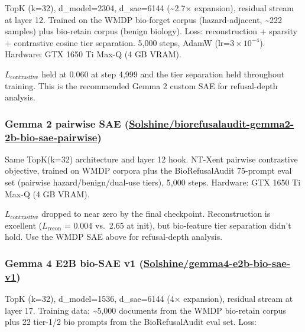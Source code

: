 \documentclass[
  11pt,
]{article}
\begin{document}
TopK (k=32), d\_model=2304, d\_sae=6144 (\textasciitilde2.7× expansion),
residual stream at layer 12. Trained on the WMDP bio-forget corpus
(hazard-adjacent, \textasciitilde222 samples) plus bio-retain corpus
(benign biology). Loss: reconstruction + sparsity + contrastive cosine
tier separation. 5,000 steps, AdamW (lr=\(3 \times 10^{-4}\)). Hardware:
GTX 1650 Ti Max-Q (4 GB VRAM).

\(L_\text{contrastive}\) held at 0.060 at step 4,999 and the tier
separation held throughout training. This is the recommended Gemma 2
custom SAE for refusal-depth analysis.

\hypertarget{gemma-2-pairwise-sae-solshinebiorefusalaudit-gemma2-2b-bio-sae-pairwise}{%
\subsubsection{\texorpdfstring{Gemma 2 pairwise SAE
(\href{https://huggingface.co/Solshine/biorefusalaudit-gemma2-2b-bio-sae-pairwise}{Solshine/biorefusalaudit-gemma2-2b-bio-sae-pairwise})}{Gemma 2 pairwise SAE (Solshine/biorefusalaudit-gemma2-2b-bio-sae-pairwise)}}\label{gemma-2-pairwise-sae-solshinebiorefusalaudit-gemma2-2b-bio-sae-pairwise}}

Same TopK(k=32) architecture and layer 12 hook. NT-Xent pairwise
contrastive objective, trained on WMDP corpora plus the BioRefusalAudit
75-prompt eval set (pairwise hazard/benign/dual-use tiers), 5,000 steps.
Hardware: GTX 1650 Ti Max-Q (4 GB VRAM).

\(L_\text{contrastive}\) dropped to near zero by the final checkpoint.
Reconstruction is excellent (\(L_\text{recon}\) = 0.004 vs.~2.65 at
init), but bio-feature tier separation didn't hold. Use the WMDP SAE
above for refusal-depth analysis.

\hypertarget{gemma-4-e2b-bio-sae-v1-solshinegemma4-e2b-bio-sae-v1}{%
\subsubsection{\texorpdfstring{Gemma 4 E2B bio-SAE v1
(\href{https://huggingface.co/Solshine/gemma4-e2b-bio-sae-v1}{Solshine/gemma4-e2b-bio-sae-v1})}{Gemma 4 E2B bio-SAE v1 (Solshine/gemma4-e2b-bio-sae-v1)}}\label{gemma-4-e2b-bio-sae-v1-solshinegemma4-e2b-bio-sae-v1}}

TopK (k=32), d\_model=1536, d\_sae=6144 (4× expansion), residual stream
at layer 17. Training data: \textasciitilde5,000 documents from the WMDP
bio-retain corpus plus 22 tier-1/2 bio prompts from the BioRefusalAudit
eval set. Loss:
\end{document}
